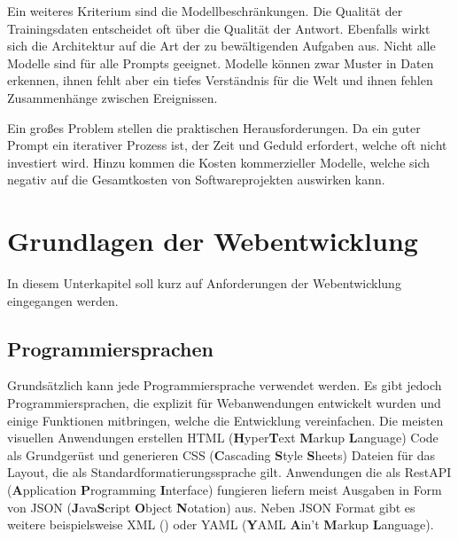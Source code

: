 Ein weiteres Kriterium sind die Modellbeschränkungen. Die Qualität der Trainingsdaten entscheidet oft über die Qualität der Antwort. Ebenfalls wirkt sich die Architektur auf die Art der zu bewältigenden Aufgaben aus. Nicht alle Modelle sind für alle Prompts geeignet. Modelle können zwar Muster in Daten erkennen, ihnen fehlt aber ein tiefes Verständnis für die Welt und ihnen fehlen Zusammenhänge zwischen Ereignissen.\vspace{0.2cm}

Ein großes Problem stellen die praktischen Herausforderungen. Da ein guter Prompt ein iterativer Prozess ist, der Zeit und Geduld erfordert, welche oft nicht investiert wird. Hinzu kommen die Kosten kommerzieller Modelle, welche sich negativ auf die Gesamtkosten von Softwareprojekten auswirken kann.



\section{Grundlagen der Webentwicklung}
In diesem Unterkapitel soll kurz auf Anforderungen der Webentwicklung eingegangen werden.


\subsection{Programmiersprachen}
Grundsätzlich kann jede Programmiersprache verwendet werden. Es gibt jedoch Programmiersprachen, die explizit für Webanwendungen entwickelt wurden und einige Funktionen mitbringen, welche die Entwicklung vereinfachen. Die meisten visuellen Anwendungen erstellen HTML (\textbf{H}yper\textbf{T}ext \textbf{M}arkup \textbf{L}anguage) Code als Grundgerüst und generieren CSS (\textbf{C}ascading \textbf{S}tyle \textbf{S}heets) Dateien für das Layout, die als Standardformatierungssprache gilt. Anwendungen die als RestAPI (\textbf{A}pplication \textbf{P}rogramming \textbf{I}nterface) fungieren liefern meist Ausgaben in Form von JSON (\textbf{J}ava\textbf{S}cript \textbf{O}bject \textbf{N}otation) aus. Neben JSON Format gibt es weitere beispielsweise XML () oder YAML (\textbf{Y}AML \textbf{A}in't \textbf{M}arkup \textbf{L}anguage).\vspace{0.2cm}


